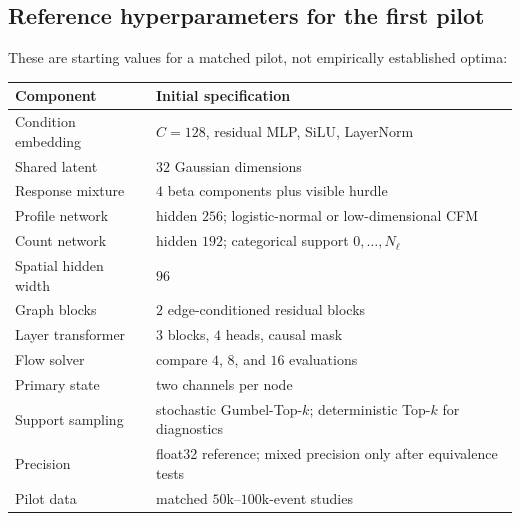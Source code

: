 \documentclass[11pt]{article}
\theoremstyle{definition}
\theoremstyle{remark}
\begin{document}
\subsection{Reference hyperparameters for the first pilot}
These are starting values for a matched pilot, not empirically established optima:
\begin{center}
\begin{tabular}{ll}
\toprule
Component & Initial specification \\
\midrule
Condition embedding & $C=128$, residual MLP, SiLU, LayerNorm \\
Shared latent & $32$ Gaussian dimensions \\
Response mixture & $4$ beta components plus visible hurdle \\
Profile network & hidden $256$; logistic-normal or low-dimensional CFM \\
Count network & hidden $192$; categorical support $0,\ldots,N_\ell$ \\
Spatial hidden width & $96$ \\
Graph blocks & $2$ edge-conditioned residual blocks \\
Layer transformer & $3$ blocks, $4$ heads, causal mask \\
Flow solver & compare $4$, $8$, and $16$ evaluations \\
Primary state & two channels per node \\
Support sampling & stochastic Gumbel-Top-$k$; deterministic Top-$k$ for diagnostics \\
Precision & float32 reference; mixed precision only after equivalence tests \\
Pilot data & matched $50$k--$100$k-event studies \\
\bottomrule
\end{tabular}
\end{center}
\end{document}
